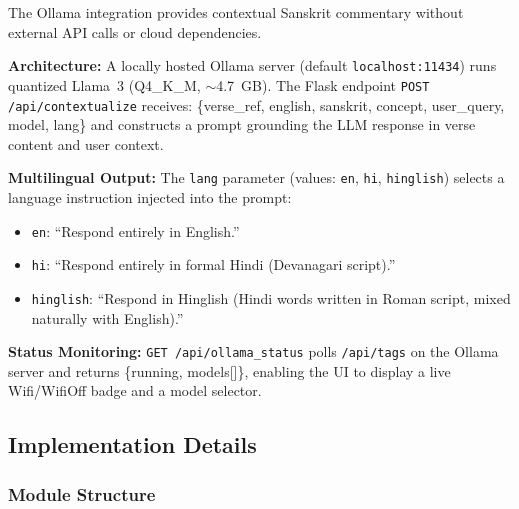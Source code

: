 \documentclass[conference]{IEEEtran}
\begin{document}
The Ollama integration provides contextual Sanskrit commentary without
external API calls or cloud dependencies.

\textbf{Architecture:} A locally hosted Ollama server (default
\texttt{localhost:11434}) runs quantized Llama~3 (Q4\_K\_M, $\sim$4.7~GB).
The Flask endpoint \texttt{POST /api/contextualize} receives:
\{verse\_ref, english, sanskrit, concept, user\_query, model, lang\}
and constructs a prompt grounding the LLM response in verse content and user context.

\textbf{Multilingual Output:} The \texttt{lang} parameter (values: \texttt{en},
\texttt{hi}, \texttt{hinglish}) selects a language instruction injected into the
prompt:
\begin{itemize}[leftmargin=*]
  \item \texttt{en}: ``Respond entirely in English.''
  \item \texttt{hi}: ``Respond entirely in formal Hindi (Devanagari script).''
  \item \texttt{hinglish}: ``Respond in Hinglish (Hindi words written in Roman
        script, mixed naturally with English).''
\end{itemize}

\textbf{Status Monitoring:} \texttt{GET /api/ollama\_status} polls
\texttt{/api/tags} on the Ollama server and returns \{running, models[]\},
enabling the UI to display a live Wifi/WifiOff badge and a model selector.

\subsection{Implementation Details}

\subsubsection{Module Structure}
\end{document}
